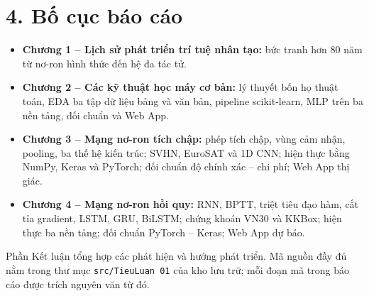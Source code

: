 \section*{4. Bố cục báo cáo}

\begin{itemize}
  \item \textbf{Chương 1 -- Lịch sử phát triển trí tuệ nhân tạo:} bức tranh hơn 80 năm từ nơ-ron hình thức đến hệ đa tác tử.
  \item \textbf{Chương 2 -- Các kỹ thuật học máy cơ bản:} lý thuyết bốn họ thuật toán, EDA ba tập dữ liệu bảng và văn bản,
    pipeline scikit-learn, MLP trên ba nền tảng, đối chuẩn và Web App.
  \item \textbf{Chương 3 -- Mạng nơ-ron tích chập:} phép tích chập, vùng cảm nhận, pooling, ba thế hệ kiến trúc;
    SVHN, EuroSAT và 1D CNN; hiện thực bằng NumPy, Keras và PyTorch; đối chuẩn độ chính xác -- chi phí; Web App thị giác.
  \item \textbf{Chương 4 -- Mạng nơ-ron hồi quy:} RNN, BPTT, triệt tiêu đạo hàm, cắt tỉa gradient, LSTM, GRU, BiLSTM;
    chứng khoán VN30 và KKBox; hiện thực ba nền tảng; đối chuẩn PyTorch -- Keras; Web App dự báo.
\end{itemize}
Phần Kết luận tổng hợp các phát hiện và hướng phát triển. Mã nguồn đầy đủ nằm trong thư mục
\texttt{src/TieuLuan 01} của kho lưu trữ; mỗi đoạn mã trong báo cáo được trích nguyên văn từ đó.
